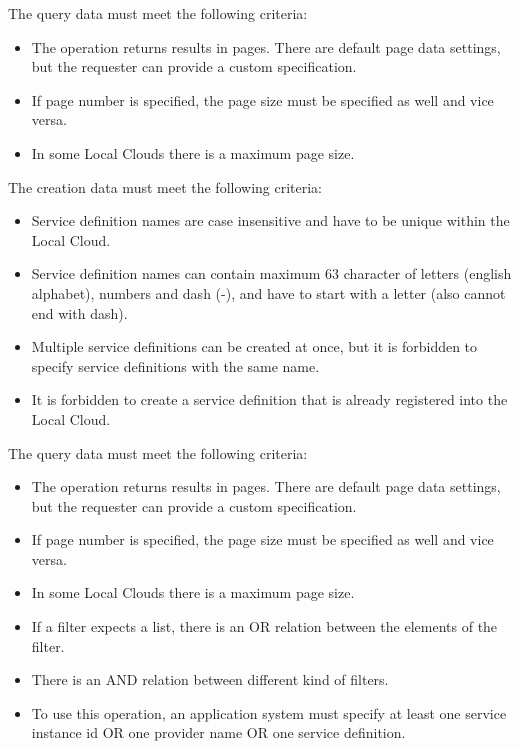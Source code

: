 \documentclass[a4paper]{arrowhead}
\begin{document}


The query data must meet the following criteria:

\begin{itemize}
    \item The operation returns results in pages. There are default page data settings, but the requester can provide a custom specification.
    \item If page number is specified, the page size must be specified as well and vice versa.
    \item In some Local Clouds there is a maximum page size.
\end{itemize}


The creation data must meet the following criteria:

\begin{itemize}
    \item Service definition names are case insensitive and have to be unique within the Local Cloud.
    \item Service definition names can contain maximum 63 character of letters (english alphabet), numbers and dash (-), and have to start with a letter (also cannot end with dash).
    \item Multiple service definitions can be created at once, but it is forbidden to specify service definitions with the same name.
    \item It is forbidden to create a service definition that is already registered into the Local Cloud.
\end{itemize}



The query data must meet the following criteria:

\begin{itemize}
    \item The operation returns results in pages. There are default page data settings, but the requester can provide a custom specification.
    \item If page number is specified, the page size must be specified as well and vice versa.
    \item In some Local Clouds there is a maximum page size.
    \item If a filter expects a list, there is an OR relation between the elements of the filter.
    \item There is an AND relation between different kind of filters.
    \item To use this operation, an application system must specify at least one service instance id OR one provider name OR one service definition.
\end{itemize}
\end{document}
